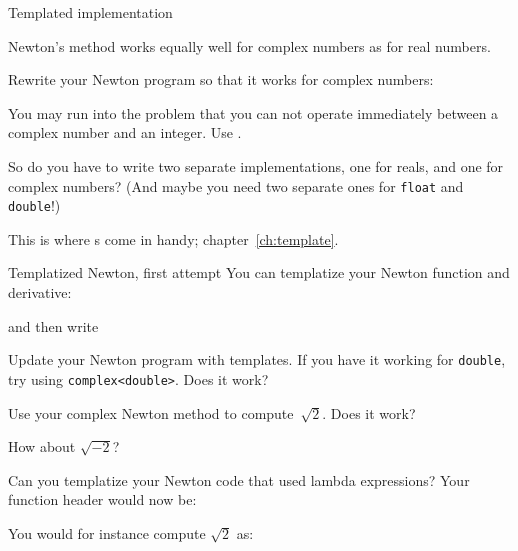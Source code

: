  {Templated implementation}
\label{sec:newton-template}

Newton's method works equally well for complex numbers as for real numbers.

\begin{exercise}
  \label{ex:newton-cplx}
  Rewrite your Newton program so that it works for complex numbers:

  You may run into the problem that
  you can not operate immediately between a complex number
  and an integer. Use .
\end{exercise}

So do you have to write two separate implementations, one for reals,
and one for complex numbers?
(And maybe you need two separate ones for \lstinline{float} and \lstinline{double}!)

This is where s come in handy; chapter~\ref{ch:template}.
\begin{plainblock}{Templatized Newton, first attempt}
  \label{sl:newt-template}
  You can templatize your Newton function and derivative:

  and then write
\end{plainblock}

\begin{exercise}
  \label{ex:newt-template1}
  Update your Newton program with templates.
  If you have it working for \lstinline{double},
  try using \lstinline{complex<double>}.
  Does it work?
\end{exercise}

\begin{exercise}
  \label{ex:newt-template2}
  Use your complex Newton method to compute~$\sqrt 2$.
  Does it work?

  How about $\sqrt{-2}$?
\end{exercise}

\begin{exercise}
  \label{ex:newt-lambda-template}
  Can you templatize your Newton code that used lambda expressions?
  Your function header would now be:

  You would for instance compute $\sqrt 2$ as:
\end{exercise}

